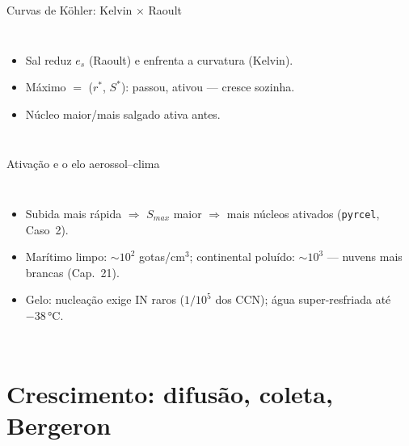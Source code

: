 \documentclass[aspectratio=169,11pt]{beamer}
\begin{document}
\begin{frame}{Curvas de Köhler: Kelvin × Raoult}
  \begin{columns}
    \vspace{0.4em}
    \begin{itemize}
      \item Sal reduz $e_s$ (Raoult) e enfrenta a curvatura (Kelvin).
      \item Máximo $=$ ($r^*$, $S^*$): passou, \alert{ativou} — cresce
            sozinha.
      \item Núcleo maior/mais salgado ativa antes.
    \end{itemize}
  \end{columns}
\end{frame}

\begin{frame}{Ativação e o elo aerossol--clima}
  \begin{columns}
    \begin{itemize}
      \item Subida mais rápida $\Rightarrow$ $S_{max}$ maior
            $\Rightarrow$ mais núcleos ativados (\texttt{pyrcel},
            Caso~2).
      \item Marítimo limpo: $\sim10^2$ gotas/cm$^3$; continental
            poluído: $\sim10^3$ — nuvens mais brancas (Cap.~21).
      \item Gelo: nucleação exige IN raros ($1/10^5$ dos CCN); água
            super-resfriada até $-38\,°$C.
    \end{itemize}
  \end{columns}
\end{frame}

\section{Crescimento: difusão, coleta, Bergeron}
\end{document}
